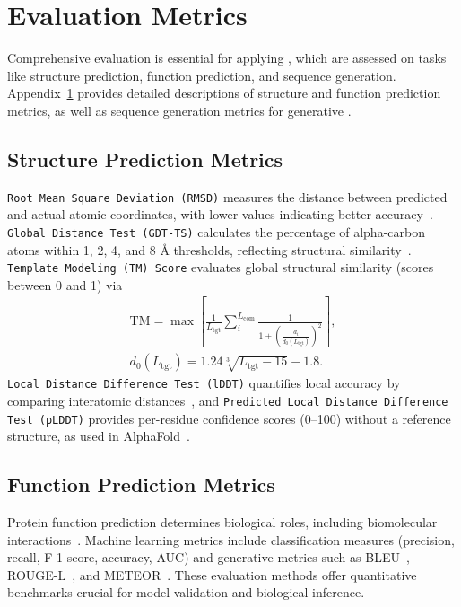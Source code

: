 \section{Evaluation Metrics}
\label{sec:eval}
Comprehensive evaluation is essential for applying \proteinllms, which are assessed on tasks like structure prediction, function prediction, and sequence generation. Appendix~\ref{sec:eval} provides detailed descriptions of structure and function prediction metrics, as well as sequence generation metrics for generative \proteinllms.

\subsection{Structure Prediction Metrics}
\texttt{Root Mean Square Deviation (RMSD)} measures the distance between predicted and actual atomic coordinates, with lower values indicating better accuracy~\cite{li2013difficulty}. \texttt{Global Distance Test (GDT-TS)} calculates the percentage of alpha-carbon atoms within 1, 2, 4, and 8 \r{A} thresholds, reflecting structural similarity~\cite{zemla2003lga}. \texttt{Template Modeling (TM) Score} evaluates global structural similarity (scores between 0 and 1) via 
\begin{gather}
\text{TM}=\max \left[ \frac{1}{L_{\text{tgt}}} \sum_{i}^{L_{\text{com}}} \frac{1}{1+\left( \frac{d_{i}}{\scriptscriptstyle d_{0}(L_{\text{tgt}})} \right)^{2}} \right], \\
d_0(L_{\text{tgt}}) = 1.24 \sqrt[3]{L_{\text{tgt}} - 15} - 1.8.
\end{gather}
\texttt{Local Distance Difference Test (lDDT)} quantifies local accuracy by comparing interatomic distances~\cite{mariani2013lddt}, and \texttt{Predicted Local Distance Difference Test (pLDDT)} provides per-residue confidence scores (0–100) without a reference structure, as used in AlphaFold~\cite{guo2022alphafold2,jumper2021highly}.

\subsection{Function Prediction Metrics}

Protein function prediction determines biological roles, including biomolecular interactions~\cite{radivojac2013large}. Machine learning metrics include classification measures (precision, recall, F-1 score, accuracy, AUC) and generative metrics such as BLEU~\cite{papineni2002bleu}, ROUGE-L~\cite{lin2004rouge}, and METEOR~\cite{banerjee2005meteor}. These evaluation methods offer quantitative benchmarks crucial for model validation and biological inference.

